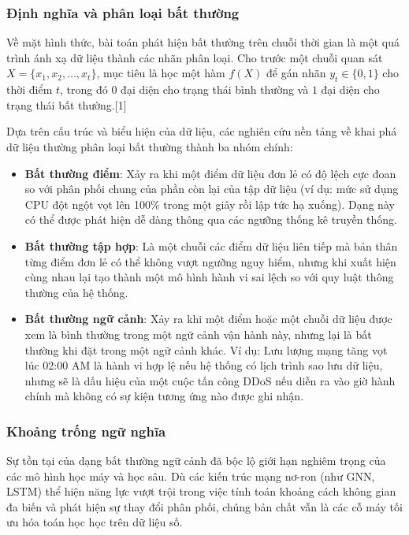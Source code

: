 \subsubsection{Định nghĩa và phân loại bất thường}
Về mặt hình thức, bài toán phát hiện bất thường trên chuỗi thời gian là một quá trình ánh xạ dữ liệu thành các nhãn phân loại. Cho trước một chuỗi quan sát $X = \{x_1, x_2, \dots, x_t\}$, mục tiêu là học một hàm $f(X)$ để gán nhãn $y_t \in \{0, 1\}$ cho thời điểm $t$, trong đó \textbf{$0$} đại diện cho trạng thái bình thường và \textbf{$1$} đại diện cho trạng thái bất thường.[1]

Dựa trên cấu trúc và biểu hiện của dữ liệu, các nghiên cứu nền tảng về khai phá dữ liệu thường phân loại bất thường thành ba nhóm chính:
\begin{itemize}
    \item \textbf{Bất thường điểm}: Xảy ra khi một điểm dữ liệu đơn lẻ có độ lệch cực đoan so với phân phối chung của phần còn lại của tập dữ liệu (ví dụ: mức sử dụng CPU đột ngột vọt lên 100\% trong một giây rồi lập tức hạ xuống). Dạng này có thể được phát hiện dễ dàng thông qua các ngưỡng thống kê truyền thống.

    \item \textbf{Bất thường tập hợp}: Là một chuỗi các điểm dữ liệu liên tiếp mà bản thân từng điểm đơn lẻ có thể không vượt ngưỡng nguy hiểm, nhưng khi xuất hiện cùng nhau lại tạo thành một mô hình hành vi sai lệch so với quy luật thông thường của hệ thống.

    \item \textbf{Bất thường ngữ cảnh}: Xảy ra khi một điểm hoặc một chuỗi dữ liệu được xem là bình thường trong một ngữ cảnh vận hành này, nhưng lại là bất thường khi đặt trong một ngữ cảnh khác. Ví dụ: Lưu lượng mạng tăng vọt lúc 02:00 AM là hành vi hợp lệ nếu hệ thống có lịch trình sao lưu dữ liệu, nhưng sẽ là dấu hiệu của một cuộc tấn công DDoS nếu diễn ra vào giờ hành chính mà không có sự kiện tương ứng nào được ghi nhận.
\end{itemize}

\subsubsection{Khoảng trống ngữ nghĩa}
Sự tồn tại của dạng bất thường ngữ cảnh đã bộc lộ giới hạn nghiêm trọng của các mô hình học máy và học sâu. Dù các kiến trúc mạng nơ-ron (như GNN, LSTM) thể hiện năng lực vượt trội trong việc tính toán khoảng cách không gian đa biến và phát hiện sự thay đổi phân phối, chúng bản chất vẫn là các cỗ máy tối ưu hóa toán học học trên dữ liệu số.

